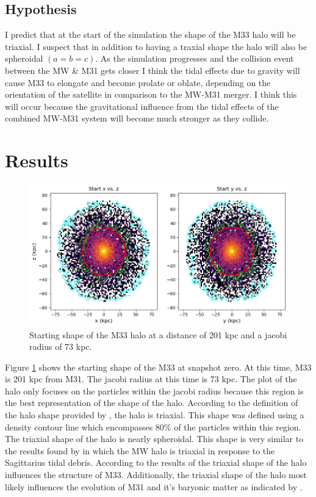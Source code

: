 \documentclass[usenatbib]{mnras}
\begin{document}
\subsection{Hypothesis} \label{hypo}
I predict that at the start of the simulation the shape of the M33 halo will be triaxial. I suspect that in addition to having a traxial shape the halo will also be spheroidal $(a=b=c)$. As the simulation progresses and the collision event between the MW \& M31 gets closer I think the tidal effects due to gravity will cause M33 to elongate and become prolate or oblate, depending on the orientation of the satellite in comparison to the MW-M31 merger. I think this will occur because the gravitational influence from the tidal effects of the combined MW-M31 system will become much stronger as they collide.   

\section{Results}
\begin{figure}
	\includegraphics[width=\columnwidth]{starting_shape.jpeg}
    \caption{Starting shape of the M33 halo at a distance of 201 kpc and a jacobi radius of 73 kpc.}
    \label{fig:start}
\end{figure}


Figure \ref{fig:start} shows the starting shape of the M33 at snapshot zero. At this time, M33 is 201 kpc from M31. The jacobi radius at this time is 73 kpc. The plot of the halo only focuses on the particles within the jacobi radius because this region is the best representation of the shape of the halo. According to the definition of the halo shape provided by \cite{Garavito-Camargo_2021}, the halo is triaxial. This shape was defined using a density contour line which encompasses 80\% of the particles within this region. The triaxial shape of the halo is nearly spheroidal. This shape is very similar to the results found by \cite{Law10} in which the MW halo is triaxial in response to the Sagittarius tidal debris. According to the results of \cite{Law10} the triaxial shape of the halo influences the structure of M33. Additionally, the triaxial shape of the halo most likely influences the evolution of M31 and it's baryonic matter as indicated by \cite{Debattista_2013}.  
\end{document}
